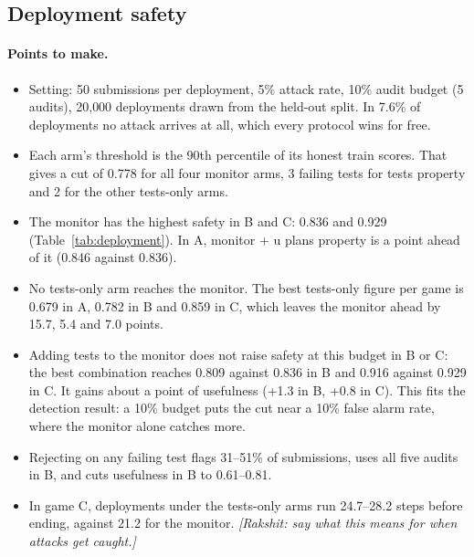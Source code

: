 \subsection{Deployment safety}
\label{sec:deployment}

\paragraph{Points to make.}
\begin{itemize}
  \item Setting: 50 submissions per deployment, 5\% attack rate, 10\% audit
        budget (5 audits), 20{,}000 deployments drawn from the held-out split.
        In 7.6\% of deployments no attack arrives at all, which every protocol
        wins for free.
  \item Each arm's threshold is the 90th percentile of its honest train scores.
        That gives a cut of 0.778 for all four monitor arms, 3 failing tests
        for tests property and 2 for the other tests-only arms.
  \item The monitor has the highest safety in B and C: 0.836 and 0.929
        (Table~\ref{tab:deployment}). In A, monitor + u plans property is a
        point ahead of it (0.846 against 0.836).
  \item No tests-only arm reaches the monitor. The best tests-only figure per
        game is 0.679 in A, 0.782 in B and 0.859 in C, which leaves the monitor
        ahead by 15.7, 5.4 and 7.0 points.
  \item Adding tests to the monitor does not raise safety at this budget in B
        or C: the best combination reaches 0.809 against 0.836 in B and 0.916
        against 0.929 in C. It gains about a point of usefulness (+1.3 in B,
        +0.8 in C). This fits the detection result: a 10\% budget puts the cut
        near a 10\% false alarm rate, where the monitor alone catches more.
  \item Rejecting on any failing test flags 31--51\% of submissions, uses all
        five audits in B, and cuts usefulness in B to 0.61--0.81.
  \item In game C, deployments under the tests-only arms run 24.7--28.2 steps
        before ending, against 21.2 for the monitor.
        \textit{[Rakshit: say what this means for when attacks get caught.]}
\end{itemize}

